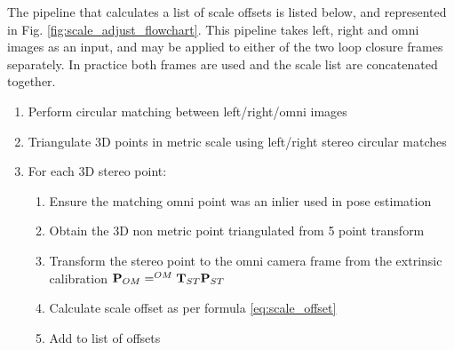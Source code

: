 The pipeline that calculates a list of scale offsets is listed below, and represented in Fig. \ref{fig:scale_adjust_flowchart}.  This pipeline takes left, right and omni images as an input, and may be applied to either of the two loop closure frames separately.  In practice both frames are used and the scale list are concatenated together.

\begin{enumerate}
\itemsep0em
 \item Perform circular matching between left/right/omni images %
 \item Triangulate 3D points in metric scale using left/right stereo circular matches
 \item For each 3D stereo point:
 \begin{enumerate}
   \item Ensure the matching omni point was an inlier used in pose estimation
   \item Obtain the 3D non metric point triangulated from 5 point transform
   \item Transform the stereo point to the omni camera frame from the extrinsic calibration $\mathbf P_{OM} =  ^{OM}\mathbf T_{ST} \mathbf P_{ST}$
   \item Calculate scale offset as per formula \ref{eq:scale_offset} %
   \item Add to list of offsets 
 \end{enumerate}
\end{enumerate} 


